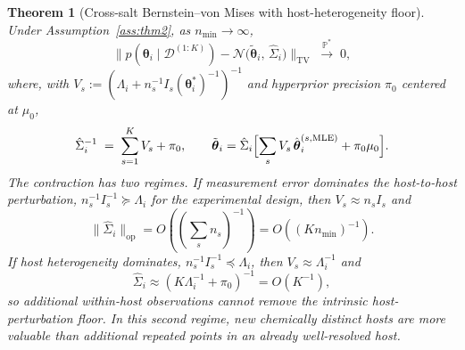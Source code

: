 \documentclass[12pt]{article}
\theoremstyle{plain}
\newtheorem{theorem}{Theorem}
\theoremstyle{definition}
\theoremstyle{remark}
\newcommand{\norm}[1]{\lVert #1 \rVert}
\begin{document}
\begin{theorem}[Cross-salt Bernstein--von Mises with host-heterogeneity floor]\label{thm:bvm}
Under Assumption~\ref{ass:thm2}, as $n_{\min}\to\infty$,
\[
  \norm{p(\boldsymbol\theta_i\mid\mathcal{D}^{(1:K)})
        - \mathcal{N}\!\bigl(\tilde{\boldsymbol\theta}_i,\,\hat\Sigma_i\bigr)}_{\mathrm{TV}}
   \;\xrightarrow{\mathbb{P}^*}\; 0,
\]
where, with $V_s:=(\Lambda_i+n_s^{-1}I_s(\boldsymbol\theta_i^*)^{-1})^{-1}$
and hyperprior precision $\pi_0$ centered at $\mu_0$,
\[
  \hat\Sigma_i^{-1} \;=\; \sum_{s=1}^K V_s + \pi_0,
  \qquad
  \tilde{\boldsymbol\theta}_i = \hat\Sigma_i\Bigl[\sum_s V_s\,
    \hat{\boldsymbol\theta}_i^{(s,\mathrm{MLE})} + \pi_0\mu_0\Bigr].
\]
The contraction has two regimes.  If measurement error dominates the
host-to-host perturbation,
$n_s^{-1}I_s^{-1}\succeq \Lambda_i$ for the experimental design, then
$V_s\approx n_s I_s$ and
\begin{equation}\label{eq:bvm_rate_measurement}
   \norm{\hat\Sigma_i}_{\mathrm{op}}
      = O\!\left((\sum_s n_s)^{-1}\right)
      = O((K n_{\min})^{-1}).
\end{equation}
If host heterogeneity dominates,
$n_s^{-1}I_s^{-1}\preceq \Lambda_i$, then $V_s\approx\Lambda_i^{-1}$ and
\begin{equation}\label{eq:bvm_rate_host}
   \hat\Sigma_i
      \approx (K\Lambda_i^{-1}+\pi_0)^{-1}
      = O(K^{-1}),
\end{equation}
so additional within-host observations cannot remove the intrinsic
host-perturbation floor.  In this second regime, new chemically distinct
hosts are more valuable than additional repeated points in an already
well-resolved host.
\end{theorem}
\end{document}
